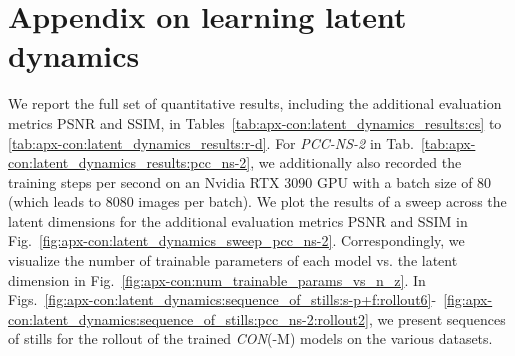 \section{Appendix on learning latent dynamics}\label{sec:apx-con:latent_dynamics_results}
We report the full set of quantitative results, including the additional evaluation metrics \gls{PSNR} and \gls{SSIM}, in Tables~\ref{tab:apx-con:latent_dynamics_results:cs} to \ref{tab:apx-con:latent_dynamics_results:r-d}. For \emph{PCC-NS-2} in Tab.~\ref{tab:apx-con:latent_dynamics_results:pcc_ns-2}, we additionally also recorded the training steps per second on an Nvidia RTX 3090 GPU with a batch size of $80$ (which leads to $8080$ images per batch).
We plot the results of a sweep across the latent dimensions for the additional evaluation metrics \gls{PSNR} and \gls{SSIM} in Fig.~\ref{fig:apx-con:latent_dynamics_sweep_pcc_ns-2}. Correspondingly, we visualize the number of trainable parameters of each model vs. the latent dimension in Fig.~\ref{fig:apx-con:num_trainable_params_vs_n_z}.
In Figs.~\ref{fig:apx-con:latent_dynamics:sequence_of_stills:s-p+f:rollout6}-~\ref{fig:apx-con:latent_dynamics:sequence_of_stills:pcc_ns-2:rollout2}, we present sequences of stills for the rollout of the trained \emph{CON}(-M) models on the various datasets. 

